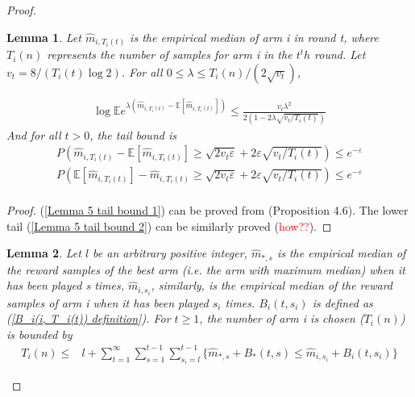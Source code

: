 \documentclass{article}
\theoremstyle{plain}
\newtheorem{lemma}{Lemma}
\begin{document}
\begin{proof}

\begin{lemma}
Let $\hat{m}_{i, T_i(t)}$ is the empirical median of arm i in round t, where $T_i(n)$ represents the number of samples for arm i in the $t^th$ round. Let $v_t = 8/(T_i(t) \log 2)$. For all $ 0 \leq \lambda \leq T_i(n)/(2 \sqrt{v_t})$,

\begin{align}
    \label{Boucheron propo 4.6}
    \log \mathbb{E} e^{\lambda\left(\hat{m}_{i, T_i(t)}-\mathbb{E}[ \hat{m}_{i, T_i(t)}]\right)} \leq \frac{v_t \lambda^2}{2(1-2\lambda \sqrt{v_t/T_i(t)})} 
\end{align}
And for all $t > 0$, the tail bound is 
\begin{align}
    \label{Lemma 5 tail bound 1}
   P\left( \hat{m}_{i, T_i(t)}-\mathbb{E}[ \hat{m}_{i, T_i(t)}] \geq \sqrt{2v_t \varepsilon} + 2 \varepsilon \sqrt{v_t/T_i(t)} \right) \leq e^{-\varepsilon}\\
   \label{Lemma 5 tail bound 2}
   P\left( \mathbb{E}[ \hat{m}_{i, T_i(t)}] - \hat{m}_{i, T_i(t)} \geq \sqrt{2v_t \varepsilon} + 2 \varepsilon \sqrt{v_t/T_i(t)} \right) \leq e^{-\varepsilon}\\
\end{align}
\end{lemma}

\begin{proof}
(\ref{Lemma 5 tail bound 1}) can be proved from \cite{boucheron2012}(Proposition 4.6). The lower tail (\ref{Lemma 5 tail bound 2}) can be similarly proved (\textcolor{red}{how??}).
\end{proof}

\begin{lemma}
Let $l$ be an arbitrary positive integer, $\hat{m}_{*, s}$ is the empirical median of the reward samples of the best arm (i.e. the arm with maximum median) when it has been played s times, $\hat{m}_{i, s_i}$, similarly, is the empirical median of the reward samples of arm i when it has been played $s_i$ times. $B_i(t, s_i)$ is defined as (\ref{B_i(i, T_i(t)) definition}). For $t \geq 1$, the number of arm i is chosen ($T_i(n)$) is bounded by
\begin{align}
    T_i(n) \leq & l + \sum_{t = 1}^\infty \sum_{s = 1}^{t-1} \sum_{s_i = l}^{t-1} \{\hat{m}_{*, s} + B_*(t, s)  \leq \hat{m}_{i, s_i} + B_i(t, s_i)\}
\end{align}
\end{lemma}
 

\end{proof}
\end{document}
